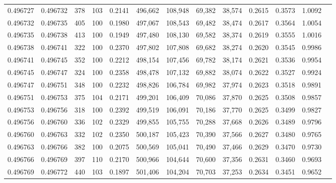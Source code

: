 \begin{tabular}{rrrrrrrrrrrrr}
0.496727 & 0.496732 &   378 & 103 &                                     0.2141 & 496,662 & 108,948 &  69,382 &  38,574 & 0.2615 & 0.3573 & 1.0092 \\
0.496732 & 0.496735 &   405 & 100 &                                     0.1980 & 497,067 & 108,543 &  69,482 &  38,474 & 0.2617 & 0.3564 & 1.0054 \\
0.496735 & 0.496738 &   413 & 100 &                                     0.1949 & 497,480 & 108,130 &  69,582 &  38,374 & 0.2619 & 0.3555 & 1.0016 \\
0.496738 & 0.496741 &   322 & 100 &                                     0.2370 & 497,802 & 107,808 &  69,682 &  38,274 & 0.2620 & 0.3545 & 0.9986 \\
0.496741 & 0.496745 &   352 & 100 &                                     0.2212 & 498,154 & 107,456 &  69,782 &  38,174 & 0.2621 & 0.3536 & 0.9954 \\
0.496745 & 0.496747 &   324 & 100 &                                     0.2358 & 498,478 & 107,132 &  69,882 &  38,074 & 0.2622 & 0.3527 & 0.9924 \\
0.496747 & 0.496751 &   348 & 100 &                                     0.2232 & 498,826 & 106,784 &  69,982 &  37,974 & 0.2623 & 0.3518 & 0.9891 \\
0.496751 & 0.496753 &   375 & 104 &                                     0.2171 & 499,201 & 106,409 &  70,086 &  37,870 & 0.2625 & 0.3508 & 0.9857 \\
0.496753 & 0.496756 &   318 & 100 &                                     0.2392 & 499,519 & 106,091 &  70,186 &  37,770 & 0.2625 & 0.3499 & 0.9827 \\
0.496756 & 0.496760 &   336 & 102 &                                     0.2329 & 499,855 & 105,755 &  70,288 &  37,668 & 0.2626 & 0.3489 & 0.9796 \\
0.496760 & 0.496763 &   332 & 102 &                                     0.2350 & 500,187 & 105,423 &  70,390 &  37,566 & 0.2627 & 0.3480 & 0.9765 \\
0.496763 & 0.496766 &   382 & 100 &                                     0.2075 & 500,569 & 105,041 &  70,490 &  37,466 & 0.2629 & 0.3470 & 0.9730 \\
0.496766 & 0.496769 &   397 & 110 &                                     0.2170 & 500,966 & 104,644 &  70,600 &  37,356 & 0.2631 & 0.3460 & 0.9693 \\
0.496769 & 0.496772 &   440 & 103 &                                     0.1897 & 501,406 & 104,204 &  70,703 &  37,253 & 0.2634 & 0.3451 & 0.9652 \\

\end{tabular}
